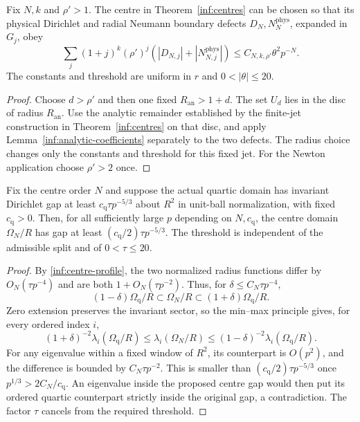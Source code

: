 \begin{corollary}
\label{inf:centre-coefficient-defect}
Fix $N,k$ and $\rho'>1$. The centre in Theorem~\ref{inf:centres}
can be chosen so that its physical Dirichlet and radial Neumann
boundary defects $D_N,N_N^{\mathrm{phys}}$, expanded in $G_j$, obey
\begin{equation}\label{inf:centre-coeff-defect-bound}
 \sum_j(1+j)^k(\rho')^j
       (|D_{N,j}|+|N_{N,j}^{\mathrm{phys}}|)
 \le C_{N,k,\rho'}\theta^2p^{-N}.
\end{equation}
The constants and threshold are uniform in $r$ and $0<|\theta|\le20$.
\end{corollary}
\begin{proof}
Choose $d>\rho'$ and then one fixed $R_{\mathrm{an}}>1+d$.
The set $U_d$ lies in the disc of radius $R_{\mathrm{an}}$.
Use the analytic remainder established by the finite-jet construction
in Theorem~\ref{inf:centres} on that disc, and apply
Lemma~\ref{inf:analytic-coefficients} separately to the two defects.
The radius choice changes only the constants and threshold for
this fixed jet. For the Newton application choose $\rho'>2$ once.
\end{proof}

\begin{proposition}
\label{inf:centre-gap-transfer}
Fix the centre order $N$ and suppose the actual quartic domain has
invariant Dirichlet gap at least $c_{\mathrm q}\tau p^{-5/3}$ about
$R^2$ in unit-ball normalization, with fixed $c_{\mathrm q}>0$.
Then, for all sufficiently large $p$ depending on $N,c_{\mathrm q}$,
the centre domain $\Omega_N/R$ has gap at least
$(c_{\mathrm q}/2)\tau p^{-5/3}$. The threshold is independent of
the admissible split and of $0<\tau\le20$.
\end{proposition}
\begin{proof}
By \eqref{inf:centre-profile}, the two normalized radius functions
differ by $O_N(\tau p^{-4})$ and are both $1+O_N(\tau p^{-2})$.
Thus, for $\delta\le C_N\tau p^{-4}$,
\[
 (1-\delta)\Omega_{\mathrm q}/R\subset\Omega_N/R
 \subset(1+\delta)\Omega_{\mathrm q}/R.
\]
Zero extension preserves the invariant sector, so the min--max
principle gives, for every ordered index $i$,
\[
 (1+\delta)^{-2}\lambda_i(\Omega_{\mathrm q}/R)
 \le\lambda_i(\Omega_N/R)
 \le(1-\delta)^{-2}\lambda_i(\Omega_{\mathrm q}/R).
\]
For any eigenvalue within a fixed window of $R^2$, its counterpart
is $O(p^2)$, and the difference is bounded by $C_N\tau p^{-2}$.
This is smaller than $(c_{\mathrm q}/2)\tau p^{-5/3}$ once
$p^{1/3}>2C_N/c_{\mathrm q}$. An eigenvalue inside the proposed
centre gap would then put its ordered quartic counterpart strictly
inside the original gap, a contradiction. The factor $\tau$ cancels
from the required threshold.
\end{proof}
